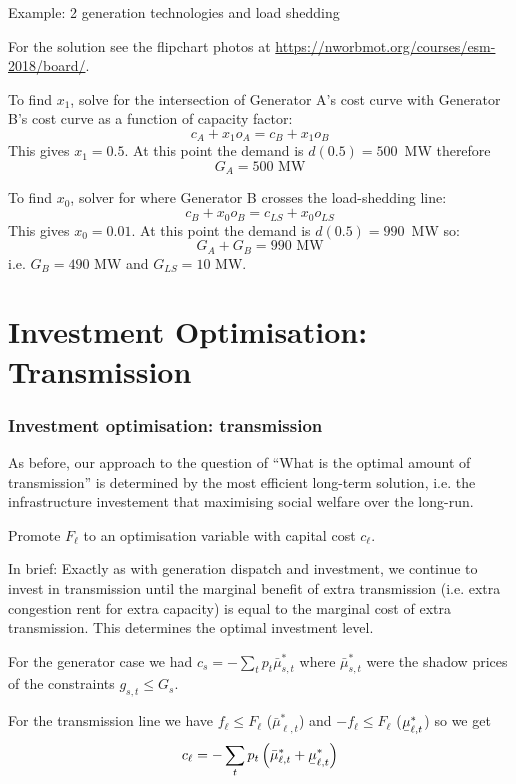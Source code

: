 \documentclass[10pt,aspectratio=169,dvipsnames]{beamer}
\newcommand{\ubar}[1]{\text{\b{$#1$}}}
\begin{document}
\begin{frame}{Example: 2 generation technologies and load shedding}

  For the solution see the flipchart photos at \url{https://nworbmot.org/courses/esm-2018/board/}.

  To find $x_1$, solve for the intersection of Generator A's cost curve with Generator B's cost curve as a function of capacity factor:
  \begin{equation*}
    c_A + x_1 o_A = c_B + x_1 o_B
  \end{equation*}
  This gives $x_1 = 0.5$. At this point the demand is $d(0.5) = 500$~MW therefore
  \begin{equation*}
    G_A = 500\textrm{ MW}
  \end{equation*}

  To find $x_0$, solver for where Generator B crosses the load-shedding line:
  \begin{equation*}
    c_B + x_0 o_B = c_{LS} + x_0 o_{LS}
  \end{equation*}
  This gives $x_0 = 0.01$. At this point the demand is $d(0.5) = 990$~MW so:
  \begin{equation*}
    G_A + G_B = 990\textrm{ MW}
  \end{equation*}
  i.e. $G_B = 490$ MW and $G_{LS} = 10$ MW.

\end{frame}

\section{Investment Optimisation: Transmission}


\begin{frame}[fragile]
  \frametitle{Investment optimisation: transmission}

  As before, our approach to the question of \alert{``What is the
    optimal amount of transmission''} is determined by the most
  efficient long-term solution, i.e. the infrastructure investement
  that maximising social welfare over the long-run.


   Promote $F_\ell$ to an optimisation variable with capital cost
   $c_\ell$.


  In brief: Exactly as with generation dispatch and investment, we
  continue to invest in transmission until the marginal benefit of
  extra transmission (i.e. extra congestion rent for extra capacity)
  is equal to the marginal cost of extra transmission. This determines
  the optimal investment level.

  For the generator case we had $c_s = - \sum_t p_t \bar{\mu}_{s,t}^*$ where $\bar{\mu}_{s,t}^*$ were the shadow prices of the constraints  $g_{s,t} \leq G_s$.

  For the transmission line we have $f_{\ell} \leq F_{\ell}$ ($\bar{\mu}_{\ell,t}^*$) and $-f_{\ell} \leq F_{\ell}$ ($\ubar{\mu}_{\ell,t}^*$) so we get
  \begin{equation*}
    c_\ell = - \sum_t p_t \left(\bar{\mu}_{\ell,t}^* + \ubar{\mu}_{\ell,t}^* \right)
  \end{equation*}

\end{frame}
\end{document}
